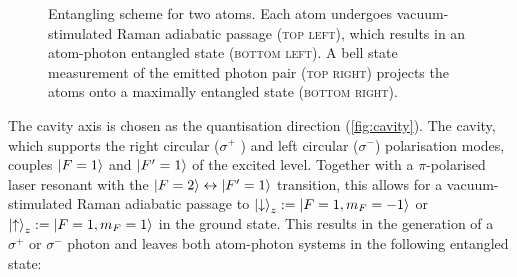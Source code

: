 \documentclass[../Thesis-IJspeert.tex]{subfiles}
\begin{document}
\begin{figure}[h]
	\caption[An example of a floating figure]{Entangling scheme for two  atoms. Each atom undergoes vacuum-stimulated Raman adiabatic passage \textsc{(top left)}, which results in an atom-photon entangled state \textsc{(bottom left)}. A bell state measurement of the emitted photon pair \textsc{(top right)} projects the atoms onto a maximally entangled state \textsc{(bottom right)}.} %
	\label{fig:entangle} 
\end{figure}
The cavity axis is chosen as the quantisation direction (\autoref{fig:cavity}). The cavity, which supports the right circular ($\sigma^+$ ) and left circular ($\sigma^-$) polarisation modes, couples $\ket{F=1}$ and $\ket{F'=1}$ of the  excited level. Together with a $\pi$-polarised laser resonant with the $\ket{F=2}\leftrightarrow \ket{F'=1}$ transition, this allows for a vacuum-stimulated Raman adiabatic passage to $\ket{\downarrow}_z:=\ket{F=1,m_F=-1}$ or $\ket{\uparrow}_z:=\ket{F=1,m_F=1}$ in the ground state. This results in the generation of a $\sigma^+$ or $\sigma^-$ photon and leaves both atom-photon systems in the following entangled state:
\end{document}
